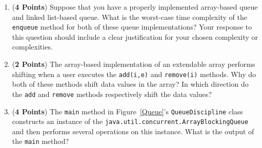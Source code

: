 \documentclass[12pt]{article}
\begin{document}
\begin{enumerate}
\begin{enumerate}

  \item ({\bf 4 Points}) Suppose that you have a properly implemented array-based queue and linked list-based queue.
    What is the worst-case time complexity of the {\tt enqueue} method for both of these queue implementations?  Your
    response to this question should include a clear justification for your chosen complexity or complexities.

  \item ({\bf 2 Points}) The array-based implementation of an extendable array performs shifting when a user executes
    the {\tt add(i,e)} and {\tt remove(i)} methods.  Why do both of these methods shift data values in the array?  In
    which direction do the {\tt add} and {\tt remove} methods respectively shift the data values?

  \item ({\bf 4 Points}) The {\tt main} method in Figure~\ref{Queue}'s {\tt QueueDiscipline} class constructs an
    instance of the {\tt java.util.concurrent.ArrayBlockingQueue} and then performs several operations on this instance.
    What is the output of the {\tt main} method?




\end{enumerate}
\end{enumerate}
\end{document}
